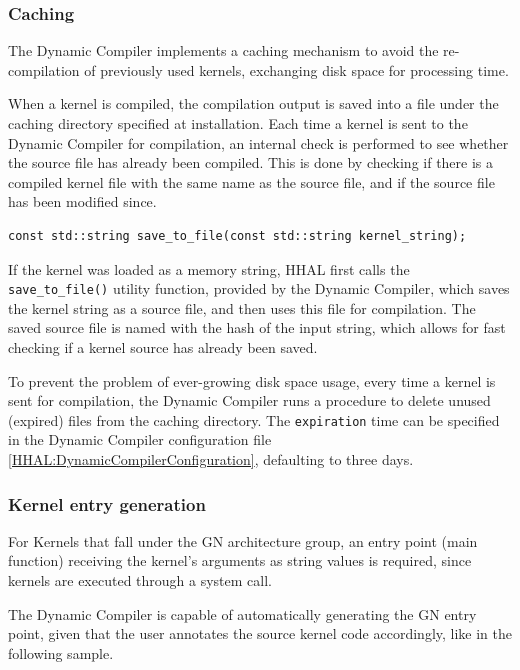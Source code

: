 \subsubsection{Caching} \label{HHAL:DynamicCompilerBinaryCaching}

The Dynamic Compiler implements a caching mechanism to avoid the re-compilation of previously used kernels, exchanging disk space for processing time.

When a kernel is compiled, the compilation output is saved into a file under the caching directory specified at installation. Each time a kernel is sent to the Dynamic Compiler for compilation, an internal check is performed to see whether the source file has already been compiled. This is done by checking if there is a compiled kernel file with the same name as the source file, and if the source file has been modified since.

\begin{lstlisting}[style=CStyle, caption=HHAL Dynamic Compiler - Save kernel string to file]
const std::string save_to_file(const std::string kernel_string);
\end{lstlisting}

If the kernel was loaded as a memory string, HHAL first calls the \texttt{save\_to\_file()} utility function, provided by the Dynamic Compiler, which saves the kernel string as a source file, and then uses this file for compilation. The saved source file is named with the hash of the input string, which allows for fast checking if a kernel source has already been saved.

To prevent the problem of ever-growing disk space usage, every time a kernel is sent for compilation, the Dynamic Compiler runs a procedure to delete unused (expired) files from the caching directory. The \texttt{expiration} time can be specified in the Dynamic Compiler configuration file \ref{HHAL:DynamicCompilerConfiguration}, defaulting to three days.

\subsubsection{Kernel entry generation}

For Kernels that fall under the GN architecture group, an entry point (main function) receiving the kernel's arguments as string values is required, since kernels are executed through a system call.

The Dynamic Compiler is capable of automatically generating the GN entry point, given that the user annotates the source kernel code accordingly, like in the following sample.

